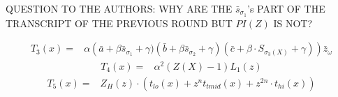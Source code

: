 QUESTION TO THE AUTHORS: WHY ARE THE $\bar{s}_{\sigma_1}$'s PART OF THE TRANSCRIPT OF THE PREVIOUS ROUND BUT $PI(Z)$ IS NOT?

\begin{equation}
\begin{array}{rl}
T_3(x) = & \alpha\left(\bar{a} + \beta \bar{s}_{\sigma_1} + \gamma)(\bar{b} + \beta \bar{s}_{\sigma_2} + \gamma)(\bar{c} + \beta \cdot S_{\sigma_3(X)} + \gamma)\right)\bar{z}_\omega
\end{array}
\end{equation}
\begin{equation}
\begin{array}{rl}
T_4(x) = &  \alpha^2 (Z(X) - 1)L_1(z)
\end{array}
\end{equation}
\begin{equation}
\begin{array}{rl}
T_5(x) = & Z_H(z) \cdot \left(t_{lo}(x) + z^n t_{tmid}(x) + z^{2n} \cdot t_{hi}(x)\right)
\end{array}
\end{equation}


